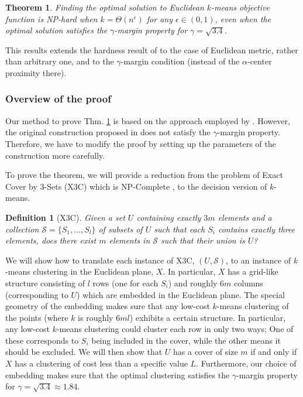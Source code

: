 \documentclass[letterpaper,12pt,titlepage,oneside,final]{book}
\newtheorem{definition}{Definition}
\newtheorem{theorem}{Theorem}
\newcommand{\mc}{\mathcal}
\begin{document}
\begin{theorem}
\label{thm:gammaLower}
Finding the optimal solution to Euclidean $k$-means objective function is NP-hard when $k=\Theta(n^\epsilon)$ for any $\epsilon \in (0,1)$, even when the optimal solution satisfies the $\gamma$-margin property for $\gamma = \sqrt{3.4}$.
\end{theorem}

This results extends the hardness result of \cite{ben2014data} to the case of Euclidean 
metric, rather than arbitrary one, and to the $\gamma$-margin condition (instead of the $\alpha$-center proximity there).

\subsubsection{Overview of the proof}

Our method to prove Thm. \ref{thm:gammaLower} is based on the approach employed by \cite{vattani2009hardness}. However, the original construction proposed in \cite{vattani2009hardness} does not satisfy the $\gamma$-margin property. Therefore, we have to modify the proof by setting up the parameters of the construction more carefully. 

To prove the theorem, we will provide a reduction from the problem of Exact Cover by 3-Sets (\textsc{X3C}) which is NP-Complete \cite{garey2002computers}, to the decision version of $k$-means.

\begin{definition}[\textsc{X3C}]
Given a set $U$ containing exactly $3m$ elements and a collection $\mc S = \{S_1, \ldots, S_l\}$ of subsets of $U$ such that each $S_i$ contains exactly three elements, does there exist $m$ elements in $\mc S$ such that their union is $U$? 
\end{definition}

We will show how to translate each instance of X3C, $(U,\mc S)$, to an instance of $k$-means clustering in the Euclidean plane, $X$. In particular, $X$ has a grid-like structure consisting of $l$ rows (one for each $S_i$) and roughly $6m$ columns (corresponding to $U$) which are embedded in the Euclidean plane. The special geometry of the embedding makes sure that any low-cost $k$-means clustering of the points (where $k$ is roughly $6ml$) exhibits a certain structure. In particular, any low-cost $k$-means clustering could cluster each row in only two ways; One of these corresponds to $S_i$ being included in the cover, while the other means it should be excluded. We will then show that $U$ has a cover of size $m$ if and only if $X$ has a clustering of cost less than a specific value $L$. Furthermore, our choice of embedding makes sure that the optimal clustering satisfies the $\gamma$-margin property for $\gamma=\sqrt{3.4} \approx 1.84$.
\end{document}
